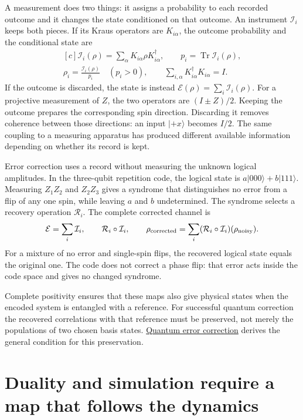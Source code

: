 \documentclass[11pt,oneside]{book}
\newenvironment{centeredalign}{\[\begin{gathered}[c]}{\end{gathered}\]}
\begin{document}
A measurement does two things: it assigns a probability to each recorded
outcome and it changes the state conditioned on that outcome. An instrument
\(\mathcal I_i\) keeps both pieces. If its Kraus operators are
\(K_{i\alpha}\), the outcome probability and the conditional state are
\begin{centeredalign}
\mathcal I_i(\rho)=\sum_\alpha K_{i\alpha}\rho K_{i\alpha}^\dagger,
\qquad p_i=\operatorname{Tr}\mathcal I_i(\rho),\\
\rho_i=\frac{\mathcal I_i(\rho)}{p_i}\quad(p_i>0),\qquad
\sum_{i,\alpha}K_{i\alpha}^\dagger K_{i\alpha}=I.
\end{centeredalign}
If the outcome is discarded, the state is instead
\(\mathcal E(\rho)=\sum_i\mathcal I_i(\rho)\). For a projective
measurement of \(Z\), the two operators are \((I\pm Z)/2\). Keeping
the outcome prepares the corresponding spin direction. Discarding it
removes coherence between those directions: an input \(|+x\rangle\)
becomes \(I/2\). The same coupling to a measuring apparatus has produced
different available information depending on whether its record is kept.

Error correction uses a record without measuring the unknown logical
amplitudes. In the three-qubit repetition code, the logical state is
\(a|000\rangle+b|111\rangle\). Measuring \(Z_1Z_2\) and \(Z_2Z_3\)
gives a syndrome that distinguishes no error from a flip of any one spin,
while leaving \(a\) and \(b\) undetermined. The syndrome selects a
recovery operation \(\mathcal R_i\). The complete corrected channel is
\begin{centeredalign}
\mathcal E=\sum_i\mathcal I_i,\qquad
\mathcal R_i\circ\mathcal I_i,\qquad
\rho_{\rm corrected}=\sum_i(\mathcal R_i\circ\mathcal I_i)(\rho_{\rm noisy}).
\end{centeredalign}
For a mixture of no error and single-spin flips, the recovered logical
state equals the original one. The code does not correct a phase flip:
that error acts inside the code space and gives no changed syndrome.

Complete positivity ensures that these maps also give physical states
when the encoded system is entangled with a reference. For successful
quantum correction the recovered correlations with that reference must
be preserved, not merely the populations of two chosen basis states.
\hyperref[topic:quantum-error-correction]{Quantum error correction}
derives the general condition for this preservation.


\section{Duality and simulation require a map that follows the dynamics}
\end{document}
